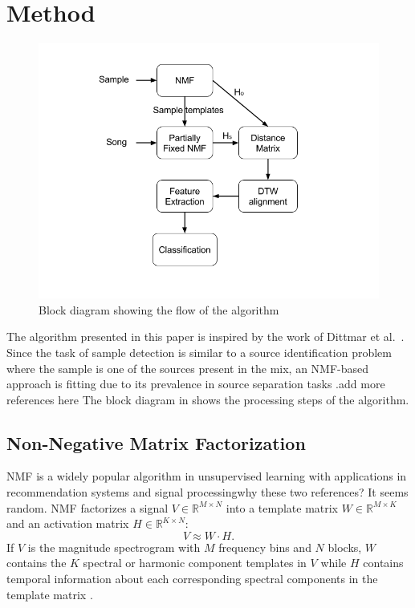 \documentclass{article}
\begin{document}
\section{Method}
\label{algo}

\begin{figure}[!ht]
\centering
\includegraphics[width=\linewidth]{block_diagram.png}
\caption{Block diagram showing the flow of the algorithm}
\label{fig_block}
\end{figure}

The algorithm presented in this paper is inspired by the work of Dittmar et al.~\cite{dittmar2012audio}. Since the task of sample detection is similar to a source identification problem where the sample is one of the sources present in the mix, an NMF-based approach is fitting due to its prevalence in source separation tasks \cite{virtanen2007monaural}.{\color{red}add more references here} The block diagram in  shows the processing steps of the algorithm.

\subsection{Non-Negative Matrix Factorization}
NMF is a widely popular algorithm in unsupervised learning with applications in recommendation systems\cite{koren2009matrix} and signal processing\cite{lee1999learning}{\color{red}why these two references? It seems random}. NMF factorizes a signal $V \in \mathbb{R}^{M\times N}$ into a template matrix $W \in \mathbb{R}^{M\times K}$ and an activation matrix $H \in \mathbb{R}^{K\times N}$:
\[ V \approx W\cdot H.\]
If $V$ is the magnitude spectrogram with $M$ frequency bins and $N$ blocks, $W$ contains the $K$ spectral or harmonic component templates in $V$ while $H$ contains temporal information about each corresponding spectral components in the template matrix \cite{smaragdis2003non}.
\end{document}
